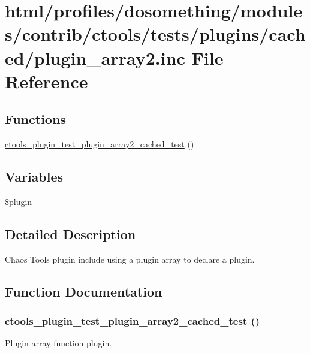 \hypertarget{cached_2plugin__array2_8inc}{
\section{html/profiles/dosomething/modules/contrib/ctools/tests/plugins/cached/plugin\_\-array2.inc File Reference}
\label{cached_2plugin__array2_8inc}
}
\subsection*{Functions}
\begin{DoxyCompactItemize}
\item 
\hyperlink{cached_2plugin__array2_8inc_a9f1e039effe16b4c42fbe12ff787ec0c}{ctools\_\-plugin\_\-test\_\-plugin\_\-array2\_\-cached\_\-test} ()
\end{DoxyCompactItemize}
\subsection*{Variables}
\begin{DoxyCompactItemize}
\item 
\hyperlink{cached_2plugin__array2_8inc_ada8a7130088351710bb02ed622d6bf65}{\$plugin}
\end{DoxyCompactItemize}


\subsection{Detailed Description}
Chaos Tools plugin include using a plugin array to declare a plugin. 

\subsection{Function Documentation}
\hypertarget{cached_2plugin__array2_8inc_a9f1e039effe16b4c42fbe12ff787ec0c}{
\subsubsection[{ctools\_\-plugin\_\-test\_\-plugin\_\-array2\_\-cached\_\-test}]{\setlength{\rightskip}{0pt plus 5cm}ctools\_\-plugin\_\-test\_\-plugin\_\-array2\_\-cached\_\-test ()}}
\label{cached_2plugin__array2_8inc_a9f1e039effe16b4c42fbe12ff787ec0c}
Plugin array function plugin. 

